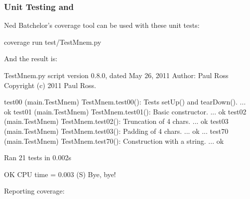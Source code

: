 \documentclass[letterpaper,10pt,english]{sphinxmanual}
\begin{document}
\subsubsection{Unit Testing and }
\label{\detokenize{testing/unit_tests:unit-testing-and-coverage}}
Ned Batchelor’s  coverage tool can be used with these unit tests:

\begin{sphinxVerbatim}[commandchars=\\\{\}]
\PYGZdl{} coverage run test/TestMnem.py
\end{sphinxVerbatim}

And the result is:

\begin{sphinxVerbatim}[commandchars=\\\{\}]
TestMnem.py script version \PYGZdq{}0.8.0\PYGZdq{}, dated May 26, 2011
Author: Paul Ross
Copyright (c) 2011 Paul Ross.

test\PYGZus{}00 (\PYGZus{}\PYGZus{}main\PYGZus{}\PYGZus{}.TestMnem)
TestMnem.test\PYGZus{}00(): Tests setUp() and tearDown(). ... ok
test\PYGZus{}01 (\PYGZus{}\PYGZus{}main\PYGZus{}\PYGZus{}.TestMnem)
TestMnem.test\PYGZus{}01(): Basic constructor. ... ok
test\PYGZus{}02 (\PYGZus{}\PYGZus{}main\PYGZus{}\PYGZus{}.TestMnem)
TestMnem.test\PYGZus{}02(): Truncation of \PYGZgt{}4 chars. ... ok
test\PYGZus{}03 (\PYGZus{}\PYGZus{}main\PYGZus{}\PYGZus{}.TestMnem)
TestMnem.test\PYGZus{}03(): Padding of \PYGZlt{}4 chars. ... ok
...
test\PYGZus{}70 (\PYGZus{}\PYGZus{}main\PYGZus{}\PYGZus{}.TestMnem)
TestMnem.test\PYGZus{}70(): Construction with a string. ... ok

\PYGZhy{}\PYGZhy{}\PYGZhy{}\PYGZhy{}\PYGZhy{}\PYGZhy{}\PYGZhy{}\PYGZhy{}\PYGZhy{}\PYGZhy{}\PYGZhy{}\PYGZhy{}\PYGZhy{}\PYGZhy{}\PYGZhy{}\PYGZhy{}\PYGZhy{}\PYGZhy{}\PYGZhy{}\PYGZhy{}\PYGZhy{}\PYGZhy{}\PYGZhy{}\PYGZhy{}\PYGZhy{}\PYGZhy{}\PYGZhy{}\PYGZhy{}\PYGZhy{}\PYGZhy{}\PYGZhy{}\PYGZhy{}\PYGZhy{}\PYGZhy{}\PYGZhy{}\PYGZhy{}\PYGZhy{}\PYGZhy{}\PYGZhy{}\PYGZhy{}\PYGZhy{}\PYGZhy{}\PYGZhy{}\PYGZhy{}\PYGZhy{}\PYGZhy{}\PYGZhy{}\PYGZhy{}\PYGZhy{}\PYGZhy{}\PYGZhy{}\PYGZhy{}\PYGZhy{}\PYGZhy{}\PYGZhy{}\PYGZhy{}\PYGZhy{}\PYGZhy{}\PYGZhy{}\PYGZhy{}\PYGZhy{}\PYGZhy{}\PYGZhy{}\PYGZhy{}\PYGZhy{}\PYGZhy{}\PYGZhy{}\PYGZhy{}\PYGZhy{}\PYGZhy{}
Ran 21 tests in 0.002s

OK
CPU time =    0.003 (S)
Bye, bye!
\end{sphinxVerbatim}

Reporting coverage:
\end{document}
